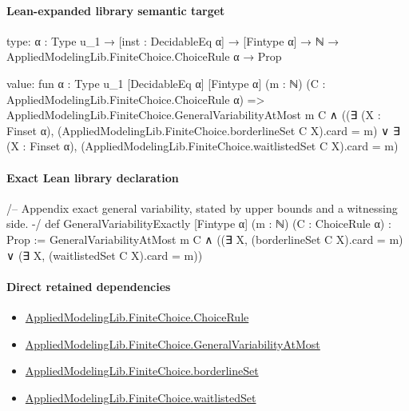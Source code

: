 \documentclass[10pt]{article}
\begin{document}
\paragraph{Lean-expanded library semantic target}
\begin{ReviewVerbatim}
type:
{α : Type u_1} → [inst : DecidableEq α] → [Fintype α] → ℕ → AppliedModelingLib.FiniteChoice.ChoiceRule α → Prop

value:
fun {α : Type u_1} [DecidableEq α] [Fintype α] (m : ℕ) (C : AppliedModelingLib.FiniteChoice.ChoiceRule α) =>
  AppliedModelingLib.FiniteChoice.GeneralVariabilityAtMost m C ∧
    ((∃ (X : Finset α), (AppliedModelingLib.FiniteChoice.borderlineSet C X).card = m) ∨
      ∃ (X : Finset α), (AppliedModelingLib.FiniteChoice.waitlistedSet C X).card = m)
\end{ReviewVerbatim}

\paragraph{Exact Lean library declaration}
\begin{ReviewVerbatim}
/-- Appendix exact general variability, stated by upper bounds and a witnessing side. -/
def GeneralVariabilityExactly [Fintype α] (m : ℕ) (C : ChoiceRule α) : Prop :=
  GeneralVariabilityAtMost m C ∧
    ((∃ X, (borderlineSet C X).card = m) ∨
      (∃ X, (waitlistedSet C X).card = m))
\end{ReviewVerbatim}

\paragraph{Direct retained dependencies}
\begin{itemize}\raggedright
\item \hyperlink{library-prerequisite-5dea5c3766008208}{Applied\allowbreak{}Modeling\allowbreak{}Lib.\allowbreak{}Finite\allowbreak{}Choice.\allowbreak{}Choice\allowbreak{}Rule}
\item \hyperlink{governing-declaration-c6eed9d8b7469007}{Applied\allowbreak{}Modeling\allowbreak{}Lib.\allowbreak{}Finite\allowbreak{}Choice.\allowbreak{}General\allowbreak{}Variability\allowbreak{}At\allowbreak{}Most}
\item \hyperlink{library-prerequisite-5ba6bdc0420301d7}{Applied\allowbreak{}Modeling\allowbreak{}Lib.\allowbreak{}Finite\allowbreak{}Choice.\allowbreak{}borderline\allowbreak{}Set}
\item \hyperlink{library-prerequisite-d9f59540dae57de5}{Applied\allowbreak{}Modeling\allowbreak{}Lib.\allowbreak{}Finite\allowbreak{}Choice.\allowbreak{}waitlisted\allowbreak{}Set}
\end{itemize}
\end{document}
